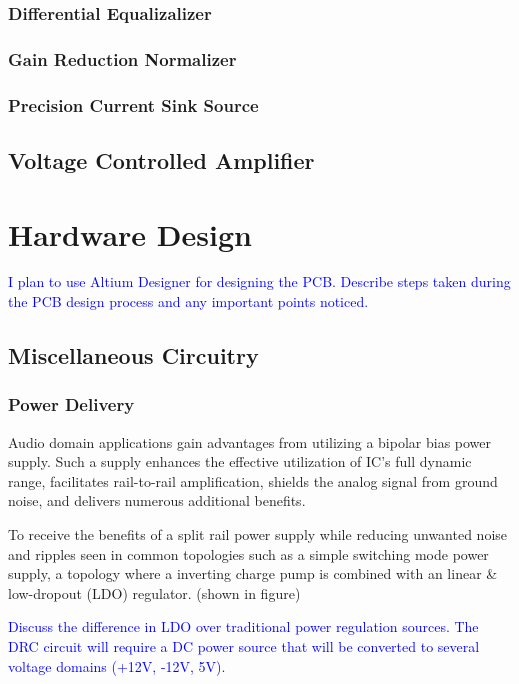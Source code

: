 \documentclass[10pt]{article}
\begin{document}
\begin{multicols*}{2}
\begin{minipage}{\linewidth}
                    \end{minipage}

                \subsubsection{Differential Equalizalizer}
                \subsubsection{Gain Reduction Normalizer}
                \subsubsection{Precision Current Sink Source}
                    \cite{ti-sink-source}

            \subsection{Voltage Controlled Amplifier}

        \section{Hardware Design}
            \textcolor{blue}{I plan to use Altium Designer for designing the PCB. Describe steps taken during the PCB design process and any important points noticed.}

            \subsection{Miscellaneous Circuitry}

                \subsubsection{Power Delivery}
                    Audio domain applications gain advantages from utilizing a bipolar bias power supply. Such a supply enhances the effective utilization of IC's full dynamic range, facilitates rail-to-rail amplification, shields the analog signal from ground noise, and delivers numerous additional benefits. \cite{ti-3-v-rails}\par
                    To receive the benefits of a split rail power supply while reducing unwanted noise and ripples seen in common topologies such as a simple switching mode power supply, a topology where a inverting charge pump is combined with an linear \& low-dropout (LDO) regulator. (shown in figure)\par
                    \textcolor{blue}{Discuss the difference in LDO over traditional power regulation sources. The DRC circuit will require a DC power source that will be converted to several voltage domains (+12V, -12V, 5V).}
                    

\end{multicols*}
\end{document}
